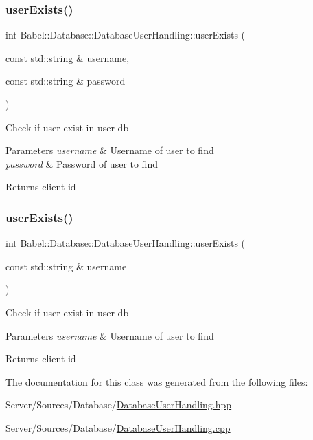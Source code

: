 \subsubsection{\texorpdfstring{user\+Exists()}{userExists()}\hspace{0.1cm}{\footnotesize\ttfamily [1/2]}}
{\footnotesize\ttfamily int Babel\+::\+Database\+::\+Database\+User\+Handling\+::user\+Exists (\begin{DoxyParamCaption}\item[{const std\+::string \&}]{username,  }\item[{const std\+::string \&}]{password }\end{DoxyParamCaption})}

Check if user exist in user db 
\begin{DoxyParams}{Parameters}
{\em username} & Username of user to find \\
\hline
{\em password} & Password of user to find \\
\hline
\end{DoxyParams}
\begin{DoxyReturn}{Returns}
client id 
\end{DoxyReturn}
\mbox{\label{classBabel_1_1Database_1_1DatabaseUserHandling_a9dcfc77a907122ae9d1e45fa415e1002}} 
\subsubsection{\texorpdfstring{user\+Exists()}{userExists()}\hspace{0.1cm}{\footnotesize\ttfamily [2/2]}}
{\footnotesize\ttfamily int Babel\+::\+Database\+::\+Database\+User\+Handling\+::user\+Exists (\begin{DoxyParamCaption}\item[{const std\+::string \&}]{username }\end{DoxyParamCaption})}

Check if user exist in user db 
\begin{DoxyParams}{Parameters}
{\em username} & Username of user to find \\
\hline
\end{DoxyParams}
\begin{DoxyReturn}{Returns}
client id 
\end{DoxyReturn}


The documentation for this class was generated from the following files\+:\begin{DoxyCompactItemize}
\item 
Server/\+Sources/\+Database/\hyperlink{DatabaseUserHandling_8hpp}{Database\+User\+Handling.\+hpp}\item 
Server/\+Sources/\+Database/\hyperlink{DatabaseUserHandling_8cpp}{Database\+User\+Handling.\+cpp}\end{DoxyCompactItemize}
